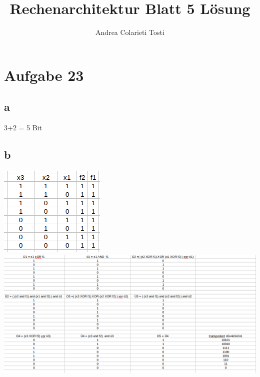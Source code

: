 \documentclass[10pt,a4paper]{article}
\author{Andrea Colarieti Tosti}
\title{Rechenarchitektur Blatt 5 Lösung}
\begin{document}
\maketitle
\section{Aufgabe 23}
\subsection{a}
3+2 = 5 Bit
\subsection{b}
\includegraphics[scale=0.5]{tabelle1.png} \\
\includegraphics[scale=0.35]{tabelle2.png} 

\newpage
\end{document}
